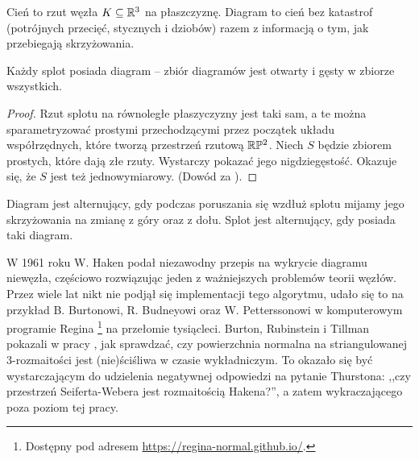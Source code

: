 \begin{definition} \label{def_diagrams}
	Cień to rzut węzła $K \subseteq \mathbb R^3$ na płaszczyznę.
	Diagram to cień bez katastrof
	(potrójnych przecięć, stycznych i dziobów)
	razem z informacją o tym, jak przebiegają skrzyżowania.
\end{definition}

\begin{proposition}
	Każdy splot posiada diagram -- zbiór diagramów jest otwarty i gęsty w zbiorze wszystkich.
\end{proposition}

\begin{proof}
	Rzut splotu na równoległe płaszyczyzny jest taki sam,
	a te można sparametryzować prostymi przechodzącymi przez początek układu współrzędnych,
	które tworzą przestrzeń rzutową $\mathbb R \mathbb P^2$.
	Niech $S$ będzie zbiorem prostych, które dają złe rzuty.
	Wystarczy pokazać jego nigdziegęstość.
	Okazuje się, że $S$ jest też jednowymiarowy.
	(Dowód za \cite{crowell63}).
\end{proof}

\begin{definition}
	Diagram jest alternujący,
	gdy podczas poruszania się wzdłuż splotu
	mijamy jego skrzyżowania na zmianę z góry oraz z dołu.
	Splot jest alternujący, gdy posiada taki diagram.
\end{definition}


W 1961 roku W. Haken \cite{haken61} podał niezawodny przepis na wykrycie diagramu niewęzła,
częściowo rozwiązując jeden z ważniejszych problemów teorii węzłów.
Przez wiele lat nikt nie podjął się implementacji tego algorytmu,
udało się to na przykład B. Burtonowi, R. Budneyowi oraz W. Petterssonowi w komputerowym programie Regina
\footnote{Dostępny pod adresem \url{https://regina-normal.github.io/}.} na przełomie tysiącleci.
Burton, Rubinstein i Tillman pokazali w pracy \cite{burton12}, jak sprawdzać,
czy powierzchnia normalna na striangulowanej 3-rozmaitości jest (nie)ściśliwa w czasie wykładniczym.
To okazało się być wystarczającym do udzielenia negatywnej odpowiedzi na pytanie Thurstona:
,,czy przestrzeń Seiferta-Webera jest rozmaitością Hakena?'',
a zatem wykraczającego poza poziom tej pracy.


